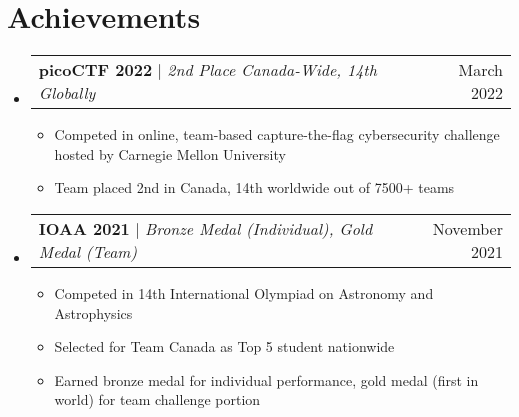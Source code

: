 \documentclass[letterpaper,11pt]{article}
\makeatletter
\newcommand{\resumeItem}[1]{
  \item\small{
    {#1 \vspace{-2pt}}
  }
}
\newcommand{\resumeProjectHeading}[2]{
    \item
    \begin{tabular*}{0.97\textwidth}{l@{\extracolsep{\fill}}r}
      \small#1 & #2 \\
    \end{tabular*}\vspace{-7pt}
}
\newcommand{\resumeSubHeadingListStart}{\begin{itemize}[leftmargin=0.15in, label={}]}
\newcommand{\resumeSubHeadingListEnd}{\end{itemize}}
\newcommand{\resumeItemListStart}{\begin{itemize}}
\newcommand{\resumeItemListEnd}{\end{itemize}\vspace{-5pt}}
\makeatother
\begin{document}
\section{Achievements}
 \resumeSubHeadingListStart
  \resumeProjectHeading
    {\textbf{picoCTF 2022} $|$ \emph{2nd Place Canada-Wide, 14th Globally}}{March 2022}
    \resumeItemListStart
      \resumeItem{Competed in online, team-based capture-the-flag cybersecurity challenge hosted by Carnegie Mellon University}
      \resumeItem{Team placed 2nd in Canada, 14th worldwide out of 7500+ teams}
    \resumeItemListEnd
  \resumeProjectHeading
    {\textbf{IOAA 2021} $|$ \emph{Bronze Medal (Individual), Gold Medal (Team)}}{November 2021}
    \resumeItemListStart
      \resumeItem{Competed in 14th International Olympiad on Astronomy and Astrophysics}
      \resumeItem{Selected for Team Canada as Top 5 student nationwide}
      \resumeItem{Earned bronze medal for individual performance, gold medal (first in world) for team challenge portion}
    \resumeItemListEnd
 \resumeSubHeadingListEnd
%
\end{document}
